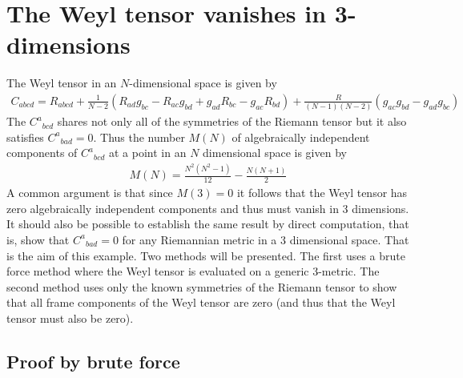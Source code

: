 \documentclass[a4paper,12pt]{article}
\numberwithin{equation}{section}%
\begin{document}
\clearpage

\section{The Weyl tensor vanishes in 3-dimensions}
\label{sec:ex-13}
\ResetCounters



The Weyl tensor in an $N$-dimensional space is given by
\begin{align*}
   C_{a b c d} = R_{a b c d} + \frac{1}{N-2} (  R_{a d} g_{b c} - R_{a c} g_{b d}
                                              + g_{a d} R_{b c} - g_{a c} R_{b d})
                             + \frac{R}{(N-1)(N-2)} (g_{a c} g_{b d} - g_{a d} g_{b c})
\end{align*}
The $C^{a}{}_{bcd}$ shares not only all of the symmetries of the Riemann tensor
but it also satisfies $C^{a}{}_{bad}=0$. Thus the number $M(N)$ of algebraically independent
components of $C^{a}{}_{bcd}$ at a point in an $N$ dimensional space is given by
\begin{align*}
   M(N) = \frac{N^2(N^2-1)}{12} - \frac{N(N+1)}{2}
\end{align*}
A common argument is that since $M(3)=0$ it follows that the Weyl tensor has zero
algebraically independent components and thus must vanish in 3 dimensions. It should also be
possible to establish the same result by direct computation, that is, show that
$C^{a}{}_{bad}=0$ for any Riemannian metric in a 3 dimensional space. That is the aim of
this example. Two methods will be presented. The first uses a brute force method where
the Weyl tensor is evaluated on a generic 3-metric. The second method uses only the known
symmetries of the Riemann tensor to show that all frame components of the Weyl tensor are
zero (and thus that the Weyl tensor must also be zero).

\subsection{Proof by brute force}
\end{document}
